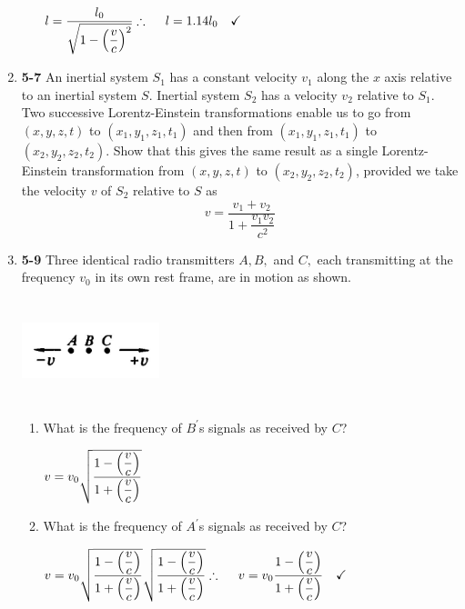 \documentclass[fleqn]{article}
\begin{document}
\begin{enumerate}
\begin{enumerate}
        \textcolor{hwColor}{
          $
            l=\dfrac{l_0}{\sqrt{1-\left(\dfrac{v}{c}\right)^2}}
            \\
            \\
            \\
            \therefore ~~~~ l=1.14 l_0 ~~~ \checkmark
          $
        }

    \end{enumerate}


    \item \textbf{5-7} An inertial system $S_1$ has a constant velocity $v_1$ along the $x$ axis relative to an inertial system $S$.
    Inertial system $S_2$ has a velocity $v_2$ relative to $S_1$. Two successive Lorentz-Einstein transformations enable us to
    go from $(x, y, z, t)$ to $(x_1, y_1, z_1, t_1)$ and then from $(x_1, y_1, z_1, t_1)$ to $(x_2, y_2, z_2, t_2)$. Show that 
    this gives the same result as a single Lorentz-Einstein transformation from $(x, y, z, t)$ to $(x_2, y_2, z_2, t_2)$,
    provided we take the velocity $v$ of $S_2$ relative to $S$ as
    $$v=\dfrac{v_1+v_2}{1+\dfrac{v_1 v_2}{c^2}}$$


    \item \textbf{5-9} Three identical radio transmitters $A, B,$ and $C,$ each transmitting at the frequency $v_0$ in its own
    rest frame, are in motion as shown.

    \includegraphics[height=3cm, width=4cm]{1.JPG}

    \begin{enumerate}
      \item What is the frequency of $B^'$s signals as received by $C$?
      
        \textcolor{hwColor}{
          $
            \\
            v=v_0 \sqrt{\dfrac{1-\left(\dfrac{v}{c}\right)}{1+\left(\dfrac{v}{c}\right)}}
            \\
          $
        }


      \item What is the frequency of $A^'$s signals as received by $C$?

        \textcolor{hwColor}{
          $
            \\
            v=v_0 \sqrt{\dfrac{1-\left(\dfrac{v}{c}\right)}{1+\left(\dfrac{v}{c}\right)}} \sqrt{\dfrac{1-\left(\dfrac{v}{c}\right)}{1+\left(\dfrac{v}{c}\right)}}
            \\
            \\
            \\
            \therefore ~~~~ v=v_0 \dfrac{1-\left(\dfrac{v}{c}\right)}{1+\left(\dfrac{v}{c}\right)} ~~~ \checkmark
            \\
          $
        }


\end{enumerate}
\end{enumerate}
\end{document}
